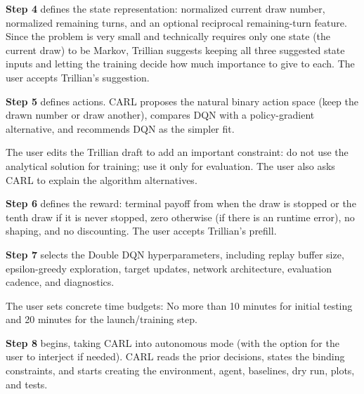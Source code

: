 \documentclass[mnsc,sglanonrev]{informs4}
\begin{document}
\begin{description}[leftmargin=1.0in,style=nextline]
\item[\href{https://youtu.be/Qx673uczp4c?t=310}{\texttt{05:10}}]
{\bf Step 4} defines the state representation: normalized current draw number, normalized remaining turns, and an optional reciprocal remaining-turn feature. Since the problem is very small and technically requires only one state (the current draw) to be Markov, Trillian suggests keeping all three suggested state inputs and letting the training decide how much importance to give to each.
The user accepts Trillian's suggestion. 

\item[\href{https://youtu.be/Qx673uczp4c?t=410}{\texttt{06:50}}]
{\bf Step 5} defines actions. CARL proposes the natural binary action space (keep the drawn number or draw another), compares DQN with a policy-gradient alternative, and recommends DQN as the simpler fit.

\item[\href{https://youtu.be/Qx673uczp4c?t=455}{\texttt{07:35}}]
The user edits the Trillian draft to add an important constraint: do not use the analytical solution for training; use it only for evaluation. The user also asks CARL to explain the algorithm alternatives.

\item[\href{https://youtu.be/Qx673uczp4c?t=595}{\texttt{09:55}}]
{\bf Step 6} defines the reward: terminal payoff from when the draw is stopped or the tenth draw if it is never stopped, zero otherwise (if there is an runtime error), no shaping, and no discounting.
The user accepts Trillian's prefill. 

\item[\href{https://youtu.be/Qx673uczp4c?t=710}{\texttt{11:50}}]
{\bf Step 7} selects the Double DQN hyperparameters, including replay buffer size, epsilon-greedy exploration, target updates, network architecture, evaluation cadence, and diagnostics.

\item[\href{https://youtu.be/Qx673uczp4c?t=740}{\texttt{12:20}}]
The user sets concrete time budgets: No more than 10 minutes for initial testing and 20 minutes for the launch/training step.

\item[\href{https://youtu.be/Qx673uczp4c?t=760}{\texttt{12:40}}]
{\bf Step 8} begins, taking CARL into autonomous mode (with the option for the user to interject if needed). CARL reads the prior decisions, states the binding constraints, and starts creating the environment, agent, baselines, dry run, plots, and tests.


\end{description}
\end{document}
